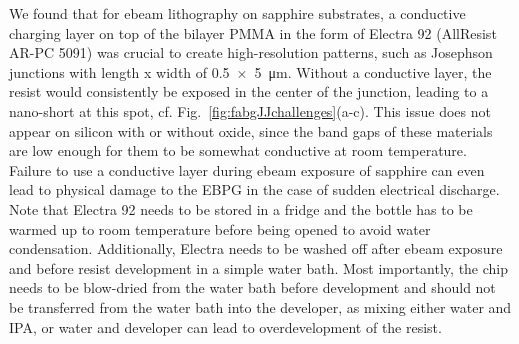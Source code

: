 We found that for ebeam lithography on sapphire substrates, a conductive charging layer on top of the bilayer PMMA in the form of Electra 92 (AllResist AR-PC 5091) was crucial to create high-resolution patterns, such as Josephson junctions with length x width of \SI{0.5x5}{\micro\meter}.
%
Without a conductive layer, the resist would consistently be exposed in the center of the junction, leading to a nano-short at this spot, cf. Fig.~\ref{fig:fabgJJchallenges}(a-c).
%
This issue does not appear on silicon with or without oxide, since the band gaps of these materials are low enough for them to be somewhat conductive at room temperature.
%
Failure to use a conductive layer during ebeam exposure of sapphire can even lead to physical damage to the EBPG in the case of sudden electrical discharge.
%
Note that Electra 92 needs to be stored in a fridge and the bottle has to be warmed up to room temperature before being opened to avoid water condensation.
%
Additionally, Electra needs to be washed off after ebeam exposure and before resist development in a simple water bath.
%
Most importantly, the chip needs to be blow-dried from the water bath before development and should not be transferred from the water bath into the developer, as mixing either water and IPA, or water and developer can lead to overdevelopment of the resist.

